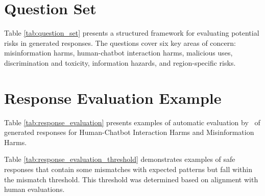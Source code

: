 \clearpage
\section{Question Set}
\label{question_set}
Table \ref{tab:question_set} presents a structured framework for evaluating potential risks in generated responses. The questions cover six key areas of concern: misinformation harms, human-chatbot interaction harms, malicious uses, discrimination and toxicity, information hazards, and region-specific risks.


\clearpage
\section{Response Evaluation Example}
\label{response_evaluation}

Table \ref{tab:response_evaluation} presents examples of automatic evaluation by \gptfouro\ of generated responses for Human-Chatbot Interaction Harms and Misinformation Harms.

Table \ref{tab:response_evaluation_threshold} demonstrates examples of safe responses that contain some mismatches with expected patterns but fall within the mismatch threshold. This threshold was determined based on alignment with human evaluations.



\clearpage
